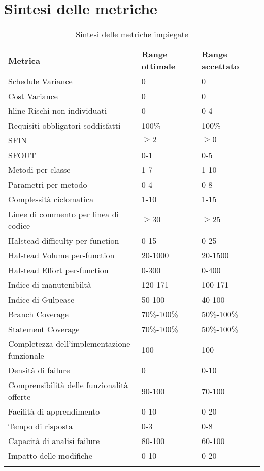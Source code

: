 \section{Sintesi delle metriche}
\begin{longtable}[H]{|C{5cm}|C{3.5cm}|C{3.5cm}|}
		\hline
		\textbf{Metrica} & \textbf{Range ottimale} & \textbf{Range accettato}  \\ \hline
		Schedule Variance & 0 & 0 \\ \hline
		Cost Variance & 0 & 0 \
		Rischi non individuati & 0 & 0-4 \\ \hline
		Requisiti obbligatori soddisfatti & 100\% & 100\% \\ \hline
		SFIN & $\geq 2$ & $\geq 0$ \\ \hline
		SFOUT & 0-1 & 0-5 \\ \hline
		Metodi per classe & 1-7 & 1-10 \\ \hline
		Parametri per metodo & 0-4 & 0-8 \\ \hline
		Complessità ciclomatica & 1-10 & 1-15 \\ \hline
		Linee di commento per linea di codice & $\geq30$ & $\geq25$ \\ \hline
		Halstead difficulty per function & 0-15 & 0-25 \\ \hline
		Halstead Volume per-function & 20-1000 &  20-1500 \\ \hline
		Halstead Effort per-function & 0-300 & 0-400 \\ \hline
		Indice di manutenibiltà & 120-171 & 100-171 \\ \hline
		Indice di Gulpease & 50-100 & 40-100 \\ \hline
		Branch Coverage & 70\%-100\% & 50\%-100\% \\ \hline
		Statement Coverage & 70\%-100\% & 50\%-100\% \\ \hline
		Completezza dell'implementazione funzionale & 100 & 100 \\ \hline
		Densità di failure & 0 & 0-10 \\ \hline
		Comprensibilità delle funzionalità offerte & 90-100 & 70-100 \\ \hline
		Facilità di apprendimento & 0-10 & 0-20 \\ \hline
		Tempo di risposta & 0-3 & 0-8 \\ \hline
		Capacità di analisi failure & 80-100 & 60-100 \\ \hline
		Impatto delle modifiche & 0-10 & 0-20 \\ \hline
		\caption{Sintesi delle metriche impiegate}
\end{longtable}